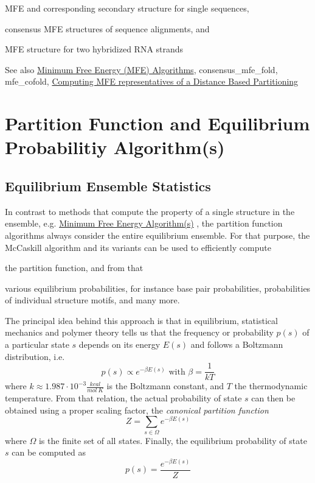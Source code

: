 \begin{DoxyItemize}
\item M\+FE and corresponding secondary structure for single sequences,
\item consensus M\+FE structures of sequence alignments, and
\item M\+FE structure for two hybridized R\+NA strands
\end{DoxyItemize}

\begin{DoxySeeAlso}{See also}
\hyperlink{group__mfe}{Minimum Free Energy (M\+FE) Algorithms}, consensus\+\_\+mfe\+\_\+fold, mfe\+\_\+cofold, \hyperlink{group__kl__neighborhood__mfe}{Computing M\+FE representatives of a Distance Based Partitioning}
\end{DoxySeeAlso}
 \hypertarget{pf_algorithm}{}\section{Partition Function and Equilibrium Probabilitiy Algorithm(s)}\label{pf_algorithm}
\hypertarget{pf_algorithm_sec_pf_intro}{}\subsection{Equilibrium Ensemble Statistics}\label{pf_algorithm_sec_pf_intro}
In contrast to methods that compute the property of a single structure in the ensemble, e.\+g. \hyperlink{mfe_algorithm}{Minimum Free Energy Algorithm(s)} , the partition function algorithms always consider the entire equilibrium ensemble. For that purpose, the Mc\+Caskill algorithm \cite{mccaskill:1990} and its variants can be used to efficiently compute


\begin{DoxyItemize}
\item the partition function, and from that
\item various equilibrium probabilities, for instance base pair probabilities, probabilities of individual structure motifs, and many more.
\end{DoxyItemize}

The principal idea behind this approach is that in equilibrium, statistical mechanics and polymer theory tells us that the frequency or probability $p(s)$ of a particular state $s$ depends on its energy $E(s)$ and follows a Boltzmann distribution, i.\+e. \[ p(s) \propto e^{-\beta E(s)} \text{ with } \beta = \frac{1}{kT} \] where $k \approx 1.987 \cdot 10^{-3} \frac{kcal}{mol~K}$ is the Boltzmann constant, and $T$ the thermodynamic temperature. From that relation, the actual probability of state $s$ can then be obtained using a proper scaling factor, the {\itshape canonical partition function} \[ Z = \sum_{s \in \Omega} e^{-\beta E(s)} \] where $\Omega$ is the finite set of all states. Finally, the equilibrium probability of state $s$ can be computed as \[ p(s) = \frac{e^{-\beta E(s)}}{Z} \]

